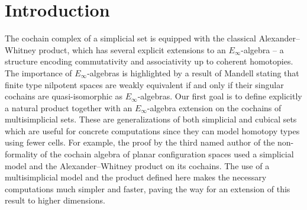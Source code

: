 
\section{Introduction}\label{s:introduction}

The cochain complex of a simplicial set is equipped with the classical Alexander--Whitney product, which has several explicit extensions to an $E_\infty$-algebra \cite{mcclure2003multivariable, berger2004combinatorial, medina2020prop1} -- a structure encoding commutativity and associativity up to coherent homotopies.
The importance of $E_\infty$-algebras is highlighted by a result of Mandell \cite{mandell2006homotopy_type} stating that finite type nilpotent spaces are weakly equivalent if and only if their singular cochains are quasi-isomorphic as $E_\infty$-algebras.
Our first goal is to define explicitly a natural product together with an $E_\infty$-algebra extension on the cochains of multisimplicial sets.
These are generalizations of both simplicial and cubical sets which are useful for concrete computations since they can model homotopy types using fewer cells.
For example, the proof by the third named author of the non-formality of the cochain algebra of planar configuration spaces \cite{formality} used a simplicial model and the Alexander--Whitney product on its cochains.
The use of a multisimplicial model and the product defined here makes the necessary computations much simpler and faster, paving the way for an extension of this result to higher dimensions.

